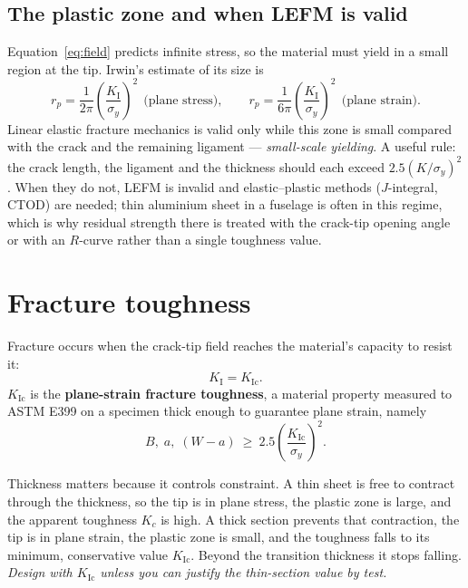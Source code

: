 \documentclass[11pt,a4paper]{article}
\begin{document}
\subsection{The plastic zone and when LEFM is valid}
Equation~\eqref{eq:field} predicts infinite stress, so the material must yield in a small region at the tip. Irwin's estimate of its size is
\begin{equation}
  r_p=\frac{1}{2\pi}\left(\frac{K_{\mathrm{I}}}{\sigma_y}\right)^{2}\ \ \text{(plane stress)},\qquad
  r_p=\frac{1}{6\pi}\left(\frac{K_{\mathrm{I}}}{\sigma_y}\right)^{2}\ \ \text{(plane strain)} .
\end{equation}
Linear elastic fracture mechanics is valid only while this zone is small compared with the crack and the remaining ligament --- \emph{small-scale yielding}. A useful rule: the crack length, the ligament and the thickness should each exceed $2.5(K/\sigma_y)^2$. When they do not, LEFM is invalid and elastic--plastic methods ($J$-integral, CTOD) are needed; thin aluminium sheet in a fuselage is often in this regime, which is why residual strength there is treated with the crack-tip opening angle or with an $R$-curve rather than a single toughness value.

\section{Fracture toughness}

Fracture occurs when the crack-tip field reaches the material's capacity to resist it:
\begin{equation}
  K_{\mathrm{I}}=K_{\mathrm{Ic}} .
\end{equation}
$K_{\mathrm{Ic}}$ is the \textbf{plane-strain fracture toughness}, a material property measured to ASTM E399 on a specimen thick enough to guarantee plane strain, namely
\begin{equation}
  B,\;a,\;(W-a)\ \ge\ 2.5\left(\frac{K_{\mathrm{Ic}}}{\sigma_y}\right)^{2}.
\end{equation}

Thickness matters because it controls constraint. A thin sheet is free to contract through the thickness, so the tip is in plane stress, the plastic zone is large, and the apparent toughness $K_c$ is high. A thick section prevents that contraction, the tip is in plane strain, the plastic zone is small, and the toughness falls to its minimum, conservative value $K_{\mathrm{Ic}}$. Beyond the transition thickness it stops falling. \emph{Design with $K_{\mathrm{Ic}}$ unless you can justify the thin-section value by test.}
\end{document}
